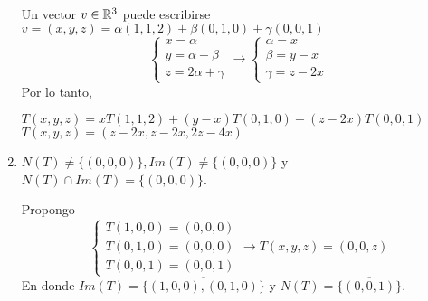 \begin{enumerate}
\begin{mdframed}[style=s]
\[\begin{matrix}
                \end{matrix}\]
                Un vector $v\in\mathbb{R}^3$ puede escribirse $v=(x,y,z)=\alpha(1,1,2)+\beta(0,1,0)+\gamma(0,0,1)$\[\begin{cases}
                    x=\alpha\\
                    y=\alpha+\beta\\
                    z=2\alpha+\gamma
                \end{cases}\to\begin{cases}
                    \alpha=x\\
                    \beta=y-x\\
                    \gamma=z-2x
                \end{cases}\]
                Por lo tanto,
                \begin{center}
                    $T(x,y,z)=xT(1,1,2)+(y-x)T(0,1,0)+(z-2x)T(0,0,1)$\\
                    $T(x,y,z)=(z-2x,z-2x,2z-4x)$
                \end{center}
            \end{mdframed}
        \item $N(T)\neq\{(0,0,0)\}, Im(T)\neq\{(0,0,0)\}$ y $N(T)\cap Im(T)=\{(0,0,0)\}$.
            \begin{mdframed}[style=s]
                Propongo \[\begin{cases}
                    T(1,0,0)=(0,0,0)\\
                    T(0,1,0)=(0,0,0)\\
                    T(0,0,1)=(0,0,1)
                \end{cases}\to T(x,y,z)=(0,0,z)\]
                En donde $Im(T)=\overline{\{(1,0,0),(0,1,0)\}}$ y $N(T)=\overline{\{(0,0,1)\}}$.
            \end{mdframed}
    \end{enumerate}